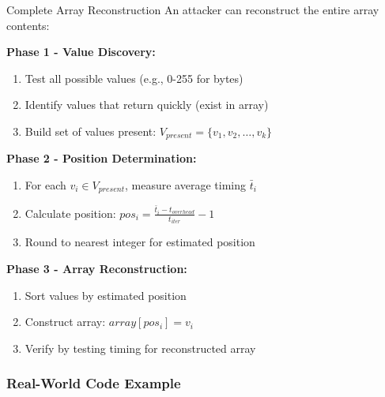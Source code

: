 \documentclass[12pt,a4paper]{article}
\theoremstyle{definition}
\begin{document}
\begin{examplebox}{Complete Array Reconstruction}
An attacker can reconstruct the entire array contents:

\textbf{Phase 1 - Value Discovery:}
\begin{enumerate}
    \item Test all possible values (e.g., 0-255 for bytes)
    \item Identify values that return quickly (exist in array)
    \item Build set of values present: $V_{present} = \{v_1, v_2, \ldots, v_k\}$
\end{enumerate}

\textbf{Phase 2 - Position Determination:}
\begin{enumerate}
    \item For each $v_i \in V_{present}$, measure average timing $\bar{t}_i$
    \item Calculate position: $pos_i = \frac{\bar{t}_i - t_{overhead}}{t_{iter}} - 1$
    \item Round to nearest integer for estimated position
\end{enumerate}

\textbf{Phase 3 - Array Reconstruction:}
\begin{enumerate}
    \item Sort values by estimated position
    \item Construct array: $array[pos_i] = v_i$
    \item Verify by testing timing for reconstructed array
\end{enumerate}
\end{examplebox}

\subsubsection{Real-World Code Example}
\end{document}
